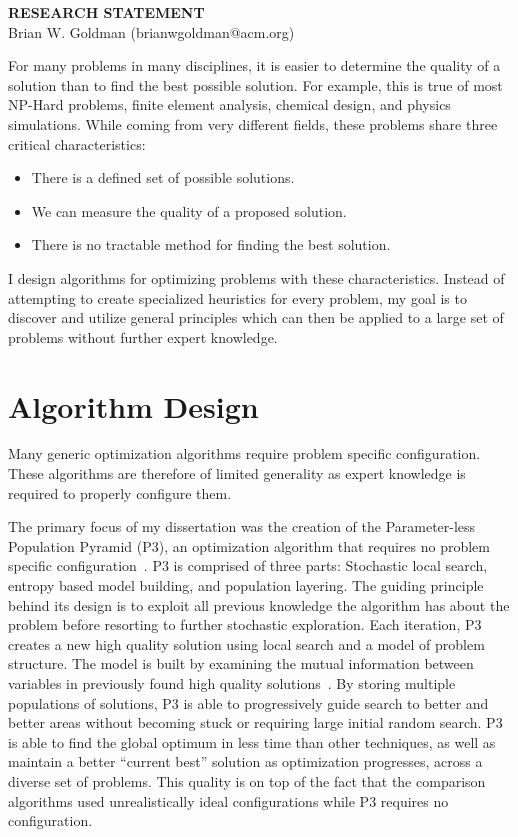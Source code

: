 \documentclass[a4paper, 11pt]{article}
\begin{document}
\thispagestyle{empty}

\pagestyle{fancy}

\begin{center}
{\LARGE \bf RESEARCH STATEMENT}\\
\vspace*{0.1cm}
{\normalsize Brian W. Goldman (brianwgoldman@acm.org)}
\end{center}

\noindent
For many problems in many disciplines, it is easier to determine the quality of a solution
than to find the best possible solution. For example, this is true of most NP-Hard problems,
finite element analysis, chemical design, and physics simulations.
While coming from very different fields, these problems share
three critical characteristics:
\begin{itemize}
\item There is a defined set of possible solutions.
\item We can measure the quality of a proposed solution.
\item There is no tractable method for finding the best solution.
\end{itemize}
I design algorithms for optimizing problems with these characteristics. Instead of
attempting to create specialized heuristics for every problem,
my goal is to discover and utilize general principles which can
then be applied to a large set of problems without further expert knowledge.

\section{Algorithm Design}
Many generic optimization algorithms require problem specific
configuration. These algorithms are therefore of limited generality
as expert knowledge is required to properly configure them.

The primary focus of my dissertation was the creation of the
Parameter-less Population Pyramid (P3), an optimization algorithm
that requires no problem specific configuration~\cite{goldman:2014:p3,goldman:2015:fastp3}.
P3 is comprised of three parts: Stochastic local search, entropy based model building, and
population layering. The guiding principle behind its design is to exploit all previous
knowledge the algorithm has about the problem before resorting to further stochastic exploration.
Each iteration, P3 creates a new high quality solution using local search and a model of
problem structure. The model is built by examining the mutual information between variables
in previously found high quality solutions~\cite{goldman:2012:ltga}.
By storing multiple populations of solutions, P3 is able to progressively guide search
to better and better areas without becoming stuck or requiring large initial random search.
P3 is able to find the global optimum in less time than other techniques, as well as
maintain a better ``current best'' solution as optimization progresses, across a diverse set of problems.
This quality is on top
of the fact that the comparison algorithms used unrealistically ideal configurations while
P3 requires no configuration.
\end{document}
